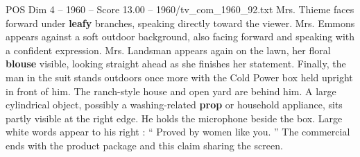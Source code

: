 \begin{textsample}{POS Dim 4 – 1960 – Score 13.00 – 1960/tv\_com\_1960\_92.txt}
Mrs.
Thieme faces forward under \textbf{leafy} branches, speaking directly toward the viewer.
Mrs.
Emmons appears against a soft outdoor background, also facing forward and speaking with a confident expression.
Mrs.
Landsman appears again on the lawn, her floral \textbf{blouse} visible, looking straight ahead as she finishes her statement.
Finally, the man in the suit stands outdoors once more with the Cold Power box held upright in front of him.
The ranch-style house and open yard are behind him.
A large cylindrical object, possibly a washing-related \textbf{prop} or household appliance, sits partly visible at the right edge.
He holds the microphone beside the box.
Large white words appear to his right : “ Proved by women like you. ” The commercial ends with the product package and this claim sharing the screen.

\end{textsample}

